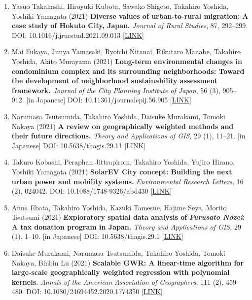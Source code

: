 \documentclass[
]{book}
\begin{document}
\begin{enumerate}
\item
  Yasuo Takahashi, Hiroyuki Kubota, Sawako Shigeto, Takahiro Yoshida, Yoshiki Yamagata (2021)
  \textbf{Diverse values of urban-to-rural migration: A case study of Hokuto City, Japan.}
  \emph{Journal of Rural Studies}, 87, 292--299.
  DOI: 10.1016/j.jrurstud.2021.09.013 {[}\href{https://www.sciencedirect.com/science/article/abs/pii/S0743016721002771}{LINK}{]}
\item
  Mai Fukaya, Junya Yamasaki, Ryoichi Nitanai, Rikutaro Manabe, Takahiro Yoshida, Akito Murayama (2021)
  \textbf{Long-term environmental changes in condominium complex and its surrounding neighborhoods: Toward the development of neighborhood sustainability assessment framework.}
  \emph{Journal of the City Planning Institute of Japan}, 56 (3), 905--912. {[}in Japanese{]}
  DOI: 10.11361/journalcpij.56.905 {[}\href{https://www.jstage.jst.go.jp/article/journalcpij/56/3/56_905/_article/-char/en}{LINK}{]}
\item
  Narumasa Tsutsumida, Takahiro Yoshida, Daisuke Murakami, Tomoki Nakaya (2021)
  \textbf{A review on geographically weighted methods and their future directions.}
  \emph{Theory and Applications of GIS,} 29 (1), 11--21. {[}in Japanese{]}
  DOI: 10.5638/thagis.29.11 {[}\href{https://www.jstage.jst.go.jp/article/thagis/29/1/29_11/_article/-char/en}{LINK}{]}
\item
  Takuro Kobashi, Peraphan Jittrapirom, Takahiro Yoshida, Yujiro Hirano, Yoshiki Yamagata (2021)
  \textbf{SolarEV City concept: Building the next urban power and mobility systems.}
  \emph{Environmental Research Letters}, 16 (2), 024042.
  DOI: 10.1088/1748-9326/abd430 {[}\href{https://doi.org/10.1088/1748-9326/abd430}{LINK}{]}
\item
  Anna Ebata, Takahiro Yoshida, Kazuki Tamesue, Hajime Seya, Morito Tsutsumi (2021)
  \textbf{Exploratory spatial data analysis of} \textbf{\emph{Furusato Nozei}: A tax donation program in Japan.}
  \emph{Theory and Applications of GIS,} 29 (1), 1--10. {[}in Japanese{]}
  DOI: 10.5638/thagis.29.1 {[}\href{https://www.jstage.jst.go.jp/article/thagis/29/1/29_1/_article/-char/en}{LINK}{]}
\item
  Daisuke Murakami, Narumasa Tsutsumida, Takahiro Yoshida, Tomoki Nakaya, Binbin Lu (2021)
  \textbf{Scalable GWR: A linear-time algorithm for large-scale geographically weighted regression with polynomial kernels.}
  \emph{Annals of the American Association of Geographers}, 111 (2), 459--480.
  DOI: 10.1080/24694452.2020.1774350 {[}\href{https://www.tandfonline.com/doi/full/10.1080/24694452.2020.1774350}{LINK}{]}

\end{enumerate}
\end{document}
